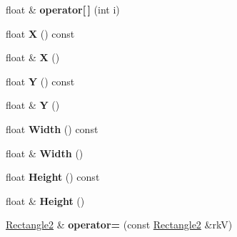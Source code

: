 \begin{DoxyCompactItemize}
\item 
float \& {\bfseries operator\mbox{[}$\,$\mbox{]}} (int i)\hypertarget{class_magnum_1_1_rectangle2_accba588f3bfe70d039330dd9073ac2fd}{}\label{class_magnum_1_1_rectangle2_accba588f3bfe70d039330dd9073ac2fd}

\item 
float {\bfseries X} () const \hypertarget{class_magnum_1_1_rectangle2_a49c5cf3f158bd42314759dcaea6a444a}{}\label{class_magnum_1_1_rectangle2_a49c5cf3f158bd42314759dcaea6a444a}

\item 
float \& {\bfseries X} ()\hypertarget{class_magnum_1_1_rectangle2_ae418c6254fadb0f2114f2efc54ec382f}{}\label{class_magnum_1_1_rectangle2_ae418c6254fadb0f2114f2efc54ec382f}

\item 
float {\bfseries Y} () const \hypertarget{class_magnum_1_1_rectangle2_ad05257bd069083629950856601ac5bd5}{}\label{class_magnum_1_1_rectangle2_ad05257bd069083629950856601ac5bd5}

\item 
float \& {\bfseries Y} ()\hypertarget{class_magnum_1_1_rectangle2_a12ef0c1eb0f7448f339384a0a961a921}{}\label{class_magnum_1_1_rectangle2_a12ef0c1eb0f7448f339384a0a961a921}

\item 
float {\bfseries Width} () const \hypertarget{class_magnum_1_1_rectangle2_adaf33d06cd1fb3c5c620f392195e5c7e}{}\label{class_magnum_1_1_rectangle2_adaf33d06cd1fb3c5c620f392195e5c7e}

\item 
float \& {\bfseries Width} ()\hypertarget{class_magnum_1_1_rectangle2_a8a12a35df71e2878282b9ad4def2d4c4}{}\label{class_magnum_1_1_rectangle2_a8a12a35df71e2878282b9ad4def2d4c4}

\item 
float {\bfseries Height} () const \hypertarget{class_magnum_1_1_rectangle2_aa570c06155f6bfddb28de5f5043395b5}{}\label{class_magnum_1_1_rectangle2_aa570c06155f6bfddb28de5f5043395b5}

\item 
float \& {\bfseries Height} ()\hypertarget{class_magnum_1_1_rectangle2_ac3cd75293f21760f36eeb3db4109e4aa}{}\label{class_magnum_1_1_rectangle2_ac3cd75293f21760f36eeb3db4109e4aa}

\item 
\hyperlink{class_magnum_1_1_rectangle2}{Rectangle2} \& {\bfseries operator=} (const \hyperlink{class_magnum_1_1_rectangle2}{Rectangle2} \&rkV)\hypertarget{class_magnum_1_1_rectangle2_a5cf1684a03edfbd00855bed9fef93b8a}{}\label{class_magnum_1_1_rectangle2_a5cf1684a03edfbd00855bed9fef93b8a}


\end{DoxyCompactItemize}
